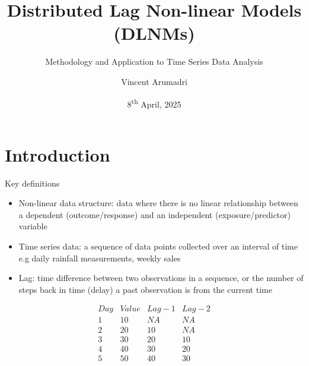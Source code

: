 \documentclass[english]{beamer}
\title{Distributed Lag Non-linear Models (DLNMs)}
\subtitle{Methodology and Application to Time Series Data Analysis }
\author{Vincent Arumadri}
\institute{Department of Public Health \\
\vspace{0.3cm} Erasmus MC}
\date{8\textsuperscript{th} April, 2025}
\newcommand{\alertblue}[1]{{\color{blue}#1}}
\begin{document}
\begin{frame}
    \titlepage
\end{frame}
\section{Introduction}
\begin{frame}{Key definitions}
   \begin{itemize}
    \item \alertblue{Non-linear data structure}: data where there is no linear relationship between a dependent (\alertblue{outcome/response}) and an independent (\alertblue{exposure/predictor}) variable
    \item \alertblue{Time series data}: a \alertblue{sequence of data points collected over an interval of time} e.g daily rainfall measurements, weekly sales 
    \item \alertblue{Lag}: time difference between two observations in a sequence, or the \alertblue{number of steps back in time (delay) a past observation is from the current time}
    \end{itemize}
    \vspace{0.15cm}
    \centering
    \footnotesize
    \[\begin{array}{|c|c|c|c|}
    {Day} & {Value} & {Lag-1} & {Lag-2}\\ \hline
    1 & 10 & NA & NA \\
    2 & 20 & 10 & NA \\
    3 & 30 & 20 & 10 \\
    4 & 40 & 30 & 20 \\
    5 & 50 & 40 & 30 
\end{array}\] 
\end{frame}
\end{document}
